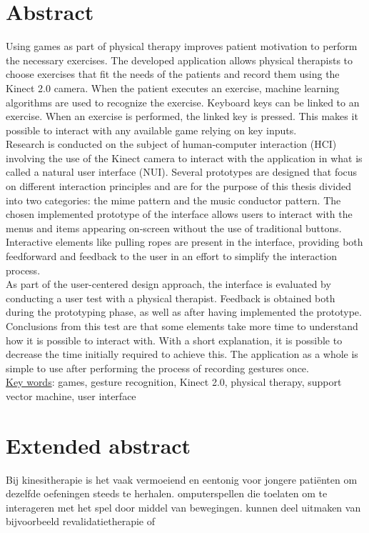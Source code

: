 \chapter*{Abstract}

Using games as part of physical therapy improves patient motivation to perform the necessary exercises. The developed application allows physical therapists to choose exercises that fit the needs of the patients and record them using the Kinect 2.0 camera. When the patient executes an exercise, machine learning algorithms are used to recognize the exercise. Keyboard keys can be linked to an exercise. When an exercise is performed, the linked key is pressed. This makes it possible to interact with any available game relying on key inputs.\\

Research is conducted on the subject of human-computer interaction (HCI) involving the use of the Kinect camera to interact with the application in what is called a natural user interface (NUI). Several prototypes are designed that focus on different interaction principles and are for the purpose of this thesis divided into two categories: the mime pattern and the music conductor pattern. The chosen implemented prototype of the interface allows users to interact with the menus and items appearing on-screen without the use of traditional buttons. Interactive elements like pulling ropes are present in the interface, providing both feedforward and feedback to the user in an effort to simplify the interaction process.\\

As part of the user-centered design approach, the interface is evaluated by conducting a user test with a physical therapist. Feedback is obtained both during the prototyping phase, as well as after having implemented the prototype. Conclusions from this test are that some elements take more time to understand how it is possible to interact with. With a short explanation, it is possible to decrease the time initially required to achieve this. The application as a whole is simple to use after performing the process of recording gestures once.\\

\underline{Key words}: games, gesture recognition, Kinect 2.0, physical therapy, support vector machine, user interface


\chapter*{Extended abstract}

Bij kinesitherapie is het vaak vermoeiend en eentonig voor jongere pati\"enten om dezelfde oefeningen steeds te herhalen. omputerspellen die toelaten om te interageren met het spel door middel van bewegingen. kunnen deel uitmaken van bijvoorbeeld revalidatietherapie of 